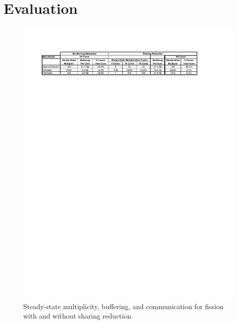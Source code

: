 \vspace{-8pt}
\section{Evaluation}
\label{sec:eval}

\begin{figure}[t]
\centering
\includegraphics[width=6.1in]{figures/big-table.pdf}
\caption{\label{fig:big-table}  Steady-state multiplicity, buffering,
  and communication for fission with and without sharing reduction.}
\vspace{-10pt}
\end{figure}


